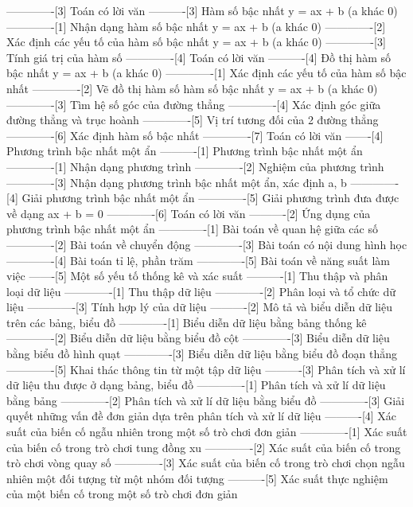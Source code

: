 -------------[3] Toán có lời văn
----------[3] Hàm số bậc nhất y = ax + b (a khác 0)
-------------[1] Nhận dạng hàm số bậc nhất y = ax + b (a khác 0)
-------------[2] Xác định các yếu tố của hàm số bậc nhất y = ax + b (a khác 0)
-------------[3] Tính giá trị của hàm số
-------------[4] Toán có lời văn
----------[4] Đồ thị hàm số bậc nhất y = ax + b (a khác 0)
-------------[1] Xác định các yếu tố của hàm số bậc nhất
-------------[2] Vẽ đồ thị hàm số hàm số bậc nhất y = ax + b (a khác 0)
-------------[3] Tìm hệ số góc của đường thẳng
-------------[4] Xác định góc giữa đường thẳng và trục hoành
-------------[5] Vị trí tương đối của 2 đường thẳng
-------------[6] Xác định hàm số bậc nhất
-------------[7] Toán có lời văn
-------[4] Phương trình bậc nhất một ẩn
----------[1] Phương trình bậc nhất một ẩn
-------------[1] Nhận dạng phương trình
-------------[2] Nghiệm của phương trình
-------------[3] Nhận dạng phương trình bậc nhất một ẩn, xác định a, b
-------------[4] Giải phương trình bậc nhất một ẩn
-------------[5] Giải phương trình đưa được về dạng ax + b = 0
-------------[6] Toán có lời văn
----------[2] Ứng dụng của phương trình bậc nhất một ẩn
-------------[1] Bài toán về quan hệ giữa các số
-------------[2] Bài toán về chuyển động
-------------[3] Bài toán có nội dung hình học
-------------[4] Bài toán tỉ lệ, phần trăm
-------------[5] Bài toán về năng suất làm việc
-------[5] Một số yếu tố thống kê và xác suất
----------[1] Thu thập và phân loại dữ liệu
-------------[1] Thu thập dữ liệu
-------------[2] Phân loại và tổ chức dữ liệu
-------------[3] Tính hợp lý của dữ liệu
----------[2] Mô tả và biểu diễn dữ liệu trên các bảng, biểu đồ
-------------[1] Biểu diễn dữ liệu bằng bảng thống kê
-------------[2] Biểu diễn dữ liệu bằng biểu đồ cột
-------------[3] Biểu diễn dữ liệu bằng biểu đồ hình quạt
-------------[3] Biểu diễn dữ liệu bằng biểu đồ đoạn thẳng
-------------[5] Khai thác thông tin từ một tập dữ liệu
----------[3] Phân tích và xử lí dữ liệu thu được ở dạng bảng, biểu đồ
-------------[1] Phân tích và xử lí dữ liệu bằng bảng
-------------[2] Phân tích và xử lí dữ liệu bằng biểu đồ
-------------[3] Giải quyết những vấn đề đơn giản dựa trên phân tích và xử lí dữ liệu
----------[4] Xác suất của biến cố ngẫu nhiên trong một số trò chơi đơn giản
-------------[1] Xác suất của biến cố trong trò chơi tung đồng xu
-------------[2] Xác suất của biến cố trong trò chơi vòng quay số
-------------[3] Xác suất của biến cố trong trò chơi chọn ngẫu nhiên một đối tượng từ một nhóm đối tượng
----------[5] Xác suất thực nghiệm của một biến cố trong một số trò chơi đơn giản
